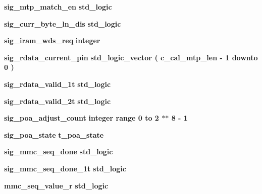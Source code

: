 \begin{DoxyCompactItemize}
\item 
{\bf sig\+\_\+mtp\+\_\+match\+\_\+en} {\bfseries \textcolor{comment}{std\+\_\+logic}\textcolor{vhdlchar}{ }} 
\item 
{\bf sig\+\_\+curr\+\_\+byte\+\_\+ln\+\_\+dis} {\bfseries \textcolor{comment}{std\+\_\+logic}\textcolor{vhdlchar}{ }} 
\item 
{\bf sig\+\_\+iram\+\_\+wds\+\_\+req} {\bfseries \textcolor{comment}{integer}\textcolor{vhdlchar}{ }} 
\item 
{\bf sig\+\_\+rdata\+\_\+current\+\_\+pin} {\bfseries \textcolor{comment}{std\+\_\+logic\+\_\+vector}\textcolor{vhdlchar}{ }\textcolor{vhdlchar}{(}\textcolor{vhdlchar}{ }\textcolor{vhdlchar}{ }\textcolor{vhdlchar}{ }\textcolor{vhdlchar}{ }{\bfseries {\bf c\+\_\+cal\+\_\+mtp\+\_\+len}} \textcolor{vhdlchar}{-\/}\textcolor{vhdlchar}{ } \textcolor{vhdldigit}{1} \textcolor{vhdlchar}{ }\textcolor{keywordflow}{downto}\textcolor{vhdlchar}{ }\textcolor{vhdlchar}{ } \textcolor{vhdldigit}{0} \textcolor{vhdlchar}{ }\textcolor{vhdlchar}{)}\textcolor{vhdlchar}{ }} 
\item 
{\bf sig\+\_\+rdata\+\_\+valid\+\_\+1t} {\bfseries \textcolor{comment}{std\+\_\+logic}\textcolor{vhdlchar}{ }} 
\item 
{\bf sig\+\_\+rdata\+\_\+valid\+\_\+2t} {\bfseries \textcolor{comment}{std\+\_\+logic}\textcolor{vhdlchar}{ }} 
\item 
{\bf sig\+\_\+poa\+\_\+adjust\+\_\+count} {\bfseries \textcolor{comment}{integer}\textcolor{vhdlchar}{ }\textcolor{vhdlchar}{ }\textcolor{vhdlchar}{ }\textcolor{keywordflow}{range}\textcolor{vhdlchar}{ }\textcolor{vhdlchar}{ } \textcolor{vhdldigit}{0} \textcolor{vhdlchar}{ }\textcolor{keywordflow}{to}\textcolor{vhdlchar}{ }\textcolor{vhdlchar}{ } \textcolor{vhdldigit}{2} \textcolor{vhdlchar}{$\ast$}\textcolor{vhdlchar}{$\ast$}\textcolor{vhdlchar}{ } \textcolor{vhdldigit}{8} \textcolor{vhdlchar}{-\/}\textcolor{vhdlchar}{ } \textcolor{vhdldigit}{1} \textcolor{vhdlchar}{ }} 
\item 
{\bf sig\+\_\+poa\+\_\+state} {\bfseries {\bfseries {\bf t\+\_\+poa\+\_\+state}} \textcolor{vhdlchar}{ }} 
\item 
{\bf sig\+\_\+mmc\+\_\+seq\+\_\+done} {\bfseries \textcolor{comment}{std\+\_\+logic}\textcolor{vhdlchar}{ }} 
\item 
{\bf sig\+\_\+mmc\+\_\+seq\+\_\+done\+\_\+1t} {\bfseries \textcolor{comment}{std\+\_\+logic}\textcolor{vhdlchar}{ }} 
\item 
{\bf mmc\+\_\+seq\+\_\+value\+\_\+r} {\bfseries \textcolor{comment}{std\+\_\+logic}\textcolor{vhdlchar}{ }} 

\end{DoxyCompactItemize}
